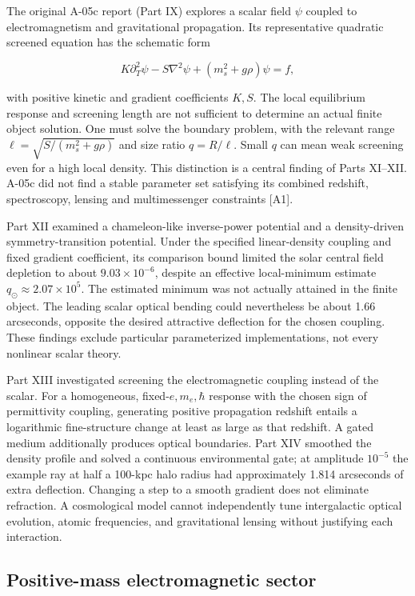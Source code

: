\documentclass[
  11pt,
  twoside]{article}
\begin{document}
The original A-05c report (Part IX) explores a scalar field \(\psi\)
coupled to electromagnetism and gravitational propagation. Its
representative quadratic screened equation has the schematic form

\[K\partial_T^2\psi-S\nabla^2\psi+(m_s^2+g\rho)\psi=f,\]

with positive kinetic and gradient coefficients \(K,S\). The local
equilibrium response and screening length are not sufficient to
determine an actual finite object solution. One must solve the boundary
problem, with the relevant range \(\ell=\sqrt{S/(m_s^2+g\rho)}\) and
size ratio \(q=R/\ell\). Small \(q\) can mean weak screening even for a
high local density. This distinction is a central finding of Parts
XI--XII. A-05c did not find a stable parameter set satisfying its
combined redshift, spectroscopy, lensing and multimessenger constraints
{[}A1{]}.

Part XII examined a chameleon-like inverse-power potential and a
density-driven symmetry-transition potential. Under the specified
linear-density coupling and fixed gradient coefficient, its comparison
bound limited the solar central field depletion to about
\(9.03\times10^{-6}\), despite an effective local-minimum estimate
\(q_\odot\approx2.07\times10^5\). The estimated minimum was not actually
attained in the finite object. The leading scalar optical bending could
nevertheless be about 1.66 arcseconds, opposite the desired attractive
deflection for the chosen coupling. These findings exclude particular
parameterized implementations, not every nonlinear scalar theory.

Part XIII investigated screening the electromagnetic coupling instead of
the scalar. For a homogeneous, fixed-\(e,m_e,\hbar\) response with the
chosen sign of permittivity coupling, generating positive propagation
redshift entails a logarithmic fine-structure change at least as large
as that redshift. A gated medium additionally produces optical
boundaries. Part XIV smoothed the density profile and solved a
continuous environmental gate; at amplitude \(10^{-5}\) the example ray
at half a 100-kpc halo radius had approximately 1.814 arcseconds of
extra deflection. Changing a step to a smooth gradient does not
eliminate refraction. A cosmological model cannot independently tune
intergalactic optical evolution, atomic frequencies, and gravitational
lensing without justifying each interaction.

\subsection{Positive-mass electromagnetic
sector}\label{positive-mass-electromagnetic-sector}
\end{document}

